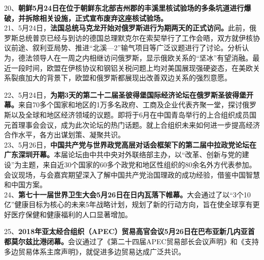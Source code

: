20、{\textbf{朝鲜5月24日在位于朝鲜东北部吉州郡的丰溪里核试验场的多条坑道进行爆破，并拆除相关设施，正式宣布废弃这座核试验场。}}\\
21、5月24日，{\textbf{法国总统马克龙开始对俄罗斯进行为期两天的正式访问。}}此前，俄罗斯总统普京已经与到访的德国总理默克尔在索契举行了工作会晤，双方就伊核协议前途、叙利亚局势、推进``北溪---2''输气项目等广泛议题进行了讨论。分析认为，德法领导人在一周之内相继访问俄罗斯，显示俄欧关系的``坚冰''有望消融。最近一段时间，欧盟在伊核协议和钢铝关税问题上均对美国展现强硬姿态，在美欧关系裂痕加大的背景下，欧盟和俄罗斯都展现出改善双边关系的强烈意愿。

22、5月24日，{\textbf{为期3天的第二十二届圣彼得堡国际经济论坛在俄罗斯圣彼得堡开幕。}}来自70多个国家和地区的1万多名政府、工商及企业代表齐聚一堂，探讨俄罗斯以及全球和地区经济领域的议题。即将于6月在中国青岛举行的上合组织成员国元首理事会会议，成为此次论坛的热门话题。就上合组织未来如何进一步提高经济合作水平，各方出谋划策、凝聚共识。\\
23、5月26日，{\textbf{中国共产党与世界政党高层对话会框架下的第二届中拉政党论坛在广东深圳开幕。}}本届论坛由中共中央对外联络部主办，以``改革、创新与党的建设''为主题，来自近30个国家的60多个政党和地区性组织的80余名外方代表参加。会议现场，与会嘉宾期望深入了解中国共产党治国理政的成功经验，借鉴中国智慧和中国方案。\\
24、{\textbf{第七十一届世界卫生大会5月26日在日内瓦落下帷幕。}}大会通过了以``3个10亿''健康目标为核心的未来5年战略计划，规划了新的行动方向，旨在使全球享有更好医疗保健和健康福利的人口显著增加。

25、{\textbf{2018年亚太经合组织（APEC）贸易高官会议5月26日在巴布亚新几内亚首都莫尔兹比港闭幕。}}会议通过了《第二十四届APEC贸易部长会议声明》和《支持多边贸易体系主席声明》，就促进多边贸易达成广泛共识。

